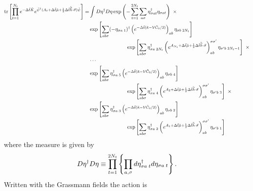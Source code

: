 \begin{align}
	\text{tr}\left[\prod_{t=1}^{N_t} e^{-\Delta \tilde{t}\tilde{K}}  e^{ \tilde{\psi}{}^{\dagger} (A_t + \Delta\tilde{t} \tilde{\mu} + \frac{1}{2} \Delta\tilde{t} \tilde{\vec{h}}\cdot\vec{\sigma})\tilde{\psi}} \right]
	=& \int D\eta{}^{\dagger} D\eta \exp\left( - \sum_{t=1}^{2N_t}\sum_{a\sigma} \eta{}^{\dagger}_{\sigma a t} \eta_{\sigma a t}\right)~ \times
	\nonumber\\
	&
		\exp\left[ \sum_{ab\sigma} (-\eta_{\sigma a\;1}){}^{\dagger} \left(e^{-\Delta \tilde{t} (\tilde{\kappa}-\mathcal{V}\tilde{C}_0/2)}\right)_{ab} \eta_{\sigma b\;2N_t} \right]
    \nonumber\\
    &   \hspace{1in}
		\exp\left[ \sum_{ab\sigma} \eta{}^{\dagger}_{\sigma a\;2N_t} \left(e^{A_{N_t}+\Delta\tilde{t}\tilde{\mu} + \frac{1}{2} \Delta\tilde{t}\tilde{\vec{h}}\cdot\vec{\sigma} }\right)_{ab}^{\sigma\sigma'} \eta_{\sigma' b\;2N_t-1}\right] ~ \times
	\nonumber\\
	&
		\cdots
	\nonumber\\
	&
		\exp\left[ \sum_{ab\sigma} \eta{}^{\dagger}_{\sigma a\;5} \left(e^{-\Delta \tilde{t} (\tilde{\kappa}-\mathcal{V}\tilde{C}_0/2)}\right)_{ab} \eta_{\sigma b\;4} \right]
    \nonumber\\
    &   \hspace{1in}
		\exp\left[ \sum_{ab\sigma} \eta{}^{\dagger}_{\sigma a\;4} \left(e^{A_{2}+\Delta\tilde{t}\tilde{\mu} + \frac{1}{2} \Delta\tilde{t}\tilde{\vec{h}}\cdot\vec{\sigma}}\right)_{ab}^{\sigma\sigma'} \eta_{\sigma' b\;3}\right] ~ \times
	\nonumber\\
	&
		\exp\left[ \sum_{ab\sigma} \eta{}^{\dagger}_{\sigma a\;3} \left(e^{-\Delta \tilde{t} (\tilde{\kappa}-\mathcal{V}\tilde{C}_0/2)}\right)_{ab} \eta_{\sigma b\;2} \right]
    \nonumber\\
    &   \hspace{1in}
		\exp\left[ \sum_{ab\sigma} \eta{}^{\dagger}_{\sigma a\;2} \left(e^{A_{1}+\Delta\tilde{t}\tilde{\mu} + \frac{1}{2} \Delta\tilde{t}\tilde{\vec{h}}\cdot\vec{\sigma}}\right)_{ab}^{\sigma\sigma'} \eta_{\sigma' b\;1}\right]
	\label{eq:grassmann integral}
\end{align}
where the measure is given by
\begin{equation}
	D\eta{}^{\dagger} D\eta \equiv \prod_{t=1}^{2N_t} \left\{ \prod_{a, \sigma} d \eta^{\dagger}_{\sigma a\; t} d\eta_{\sigma a\; t} \right\}.
\end{equation}
Written with the Grassmann fields the action is
